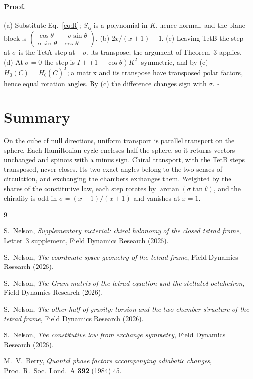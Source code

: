\documentclass[twocolumn]{iopjournal}
\begin{document}
\paragraph{Proof.} (a) Substitute Eq.~\eqref{eq:R}; $S_{ij}$ is a
polynomial in $K$, hence normal, and the plane block is
$\begin{pmatrix}\cos\theta & -\sigma\sin\theta\\ \sigma\sin\theta &
\cos\theta\end{pmatrix}$. (b) $2x/(x+1) - 1$. (c) Leaving TetB the
step at $\sigma$ is the TetA step at $-\sigma$, its transpose; the
argument of Theorem~3 applies. (d) At $\sigma = 0$ the step is
$I + (1-\cos\theta)K^2$, symmetric, and by (c)
$H_0(C) = H_0(\bar C)^T$; a matrix and its transpose have
transposed polar factors, hence equal rotation angles. By (c) the
difference changes sign with $\sigma$. \hfill $\square$


\section*{Summary}

On the cube of null directions, uniform transport is parallel
transport on the sphere. Each Hamiltonian cycle encloses half the
sphere, so it returns vectors unchanged and spinors with a minus sign.
Chiral transport, with the TetB steps transposed, never closes. Its
two exact angles belong to the two senses of circulation, and
exchanging the chambers exchanges them. Weighted by the shares of the
constitutive law, each step rotates by $\arctan(\sigma\tan\theta)$,
and the chirality is odd in $\sigma = (x-1)/(x+1)$ and vanishes at
$x = 1$.


\begin{thebibliography}{9}

S.~Nelson,
\textit{Supplementary material: chiral holonomy of the closed tetrad
frame}, Letter~3 supplement, Field Dynamics Research (2026).

S.~Nelson,
\textit{The coordinate-space geometry of the tetrad frame},
Field Dynamics Research (2026).

S.~Nelson,
\textit{The Gram matrix of the tetrad equation and the stellated
octahedron}, Field Dynamics Research (2026).

S.~Nelson,
\textit{The other half of gravity: torsion and the two-chamber
structure of the tetrad frame}, Field Dynamics Research (2026).

S.~Nelson,
\textit{The constitutive law from exchange symmetry},
Field Dynamics Research (2026).

M.~V.~Berry,
\textit{Quantal phase factors accompanying adiabatic changes},
Proc.\ R.\ Soc.\ Lond.\ A \textbf{392} (1984) 45.

\end{thebibliography}
\end{document}
